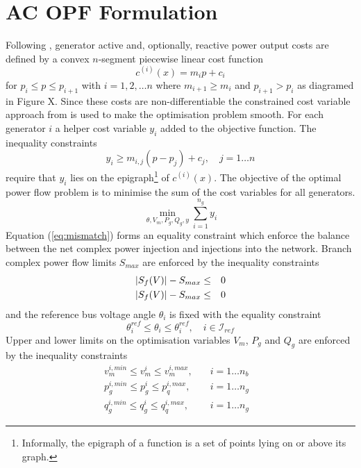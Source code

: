 \section{AC OPF Formulation}
Following \cite[p.26]{pserc:mp_manual}, generator active and, optionally,
reactive power output costs are defined by a convex $n$-segment piecewise
linear cost function
\begin{equation}
c^{(i)}(x) = m_ip + c_i
\end{equation}
for $p_i \leq p \leq p_{i+1}$ with $i = 1,2,\dotsc n$ where $m_{i+1} \geq m_i$
and $p_{i+1} > p_i$ as diagramed in Figure X.  Since these costs are
non-differentiable the constrained cost variable approach from
\cite{zimmerman:ccv} is used to make the optimisation problem smooth.  For
each generator $i$ a helper cost variable $y_i$ added to the objective
function.  The inequality constraints
\begin{equation}
y_i \geq m_{i,j}(p-p_j) + c_j, \quad j = 1\dotsc n
\end{equation}
require that $y_i$ lies on the epigraph\footnote{Informally, the epigraph of a
function is a set of points lying on or above its graph.} of $c^{(i)}(x)$. The objective of
the optimal power flow problem is to minimise the sum of the cost variables
for all generators.
\begin{equation}
\min_{\theta, V_m, P_g, Q_g, y} \sum_{i=1}^{n_g}y_i
\end{equation}
Equation (\ref{eq:mismatch}) forms an equality constraint which enforce the
balance between the net complex power injection and injections into the
network.  Branch complex power flow limits $S_{max}$ are enforced by the
inequality constraints
\begin{eqnarray}
\lvert S_f(V)\rvert - S_{max}& \leq &0\\
\lvert S_f(V)\rvert - S_{max}& \leq &0
\end{eqnarray}
and the reference bus voltage angle $\theta_i$ is fixed with the equality
constraint
\begin{equation}
\label{eq:refbusang}
\theta_i^{ref} \leq \theta_i \leq \theta_i^{ref}, \quad i \in \mathcal{I}_{ref}
\end{equation}
Upper and lower limits on the optimisation variables $V_m$, $P_g$ and $Q_g$ are
enforced by the inequality constraints
\begin{eqnarray}
v_m^{i,min} \leq v_m^i \leq v_m^{i,max},& \quad i= 1 \dotsc n_b&\\
\label{eq:pglim}
p_g^{i,min} \leq p_g^i \leq p_q^{i,max},& \quad i= 1 \dotsc n_g&\\
q_g^{i,min} \leq q_g^i \leq q_q^{i,max},& \quad i= 1 \dotsc n_g&
\end{eqnarray}

